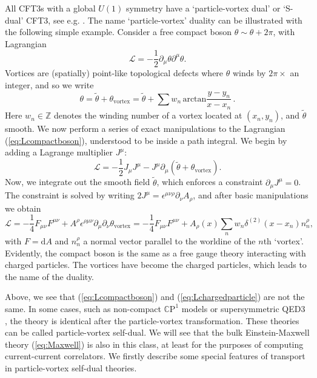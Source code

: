\documentclass[10pt, oneside]{book}
\begin{document}
\begin{doublespace}
All CFT3s with a global $U(1)$ symmetry have a `particle-vortex dual' or `S-dual' CFT3, see e.g. \cite{Witten:2003ya}.
The name `particle-vortex' duality can be illustrated with the following simple example. Consider a free compact boson $\theta \sim \theta + 2\pi$,  with Lagrangian
\begin{equation}
\mathcal{L} = -\frac{1}{2}\partial_\mu \theta \partial^\mu \theta.  \label{eq:Lcompactboson}
\end{equation}
Vortices are (spatially) point-like topological defects where $\theta$ winds by $2\pi\times$ an integer, and so we write \begin{equation}
\theta = \tilde\theta + \theta_{\text{vortex}}  = \tilde\theta + \sum w_n \, \mathrm{arctan} \frac{y-y_n}{x-x_n} \,.
\end{equation}
Here $w_n\in \mathbb{Z}$ denotes the winding number of a vortex located at $(x_n,y_n)$, and $\tilde\theta$ smooth.  We now perform a series of exact manipulations to the Lagrangian (\ref{eq:Lcompactboson}), understood to be inside a path integral.  We begin by adding a Lagrange multiplier $J^\mu$:\begin{equation}
\mathcal{L} =  -\frac{1}{2} J_\mu  J^\mu - J^\mu \partial_\mu (\tilde\theta + \theta_{\text{vortex}}).
\end{equation}
Now, we integrate out the smooth field $\tilde\theta$, which enforces a constraint $\partial_\mu J^\mu=0$.  The constraint is solved by writing $2J^\mu = \epsilon^{\mu\nu\rho}\partial_\nu A_\rho$, and after basic manipulations we obtain \begin{equation}
\mathcal{L} = -\frac{1}{4}F_{\mu\nu} F^{\mu\nu} + A^\rho \epsilon^{\rho\mu\nu}\partial_\mu \partial_\nu \theta_{\text{vortex}} = -\frac{1}{4}F_{\mu\nu} F^{\mu\nu} + A_\rho(x) \sum_n w_n   \delta^{(2)}(x-x_n) n_n^\rho, \label{eq:Lchargedparticle}
\end{equation}
with $F=\mathrm{d}A$ and $n_n^\rho$ a normal vector parallel to the worldine of the $n$th `vortex'.  Evidently, the compact boson is the same as a free gauge theory interacting with charged particles.   The vortices have become the charged particles, which leads to the name of the duality.

Above, we see that (\ref{eq:Lcompactboson}) and (\ref{eq:Lchargedparticle}) are not the same.  In some cases, such as non-compact $\mathbb{C}\mathrm{P}^1$ models \cite{vishwanath2003} or supersymmetric QED3 \cite{Kapustin:1999ha}, the theory is identical after the particle-vortex transformation.  These theories can be called particle-vortex self-dual. We will see that the bulk Einstein-Maxwell theory (\ref{eq:Maxwell}) is also in this class, at least for the purposes of computing current-current correlators. We firstly describe some special features of transport in particle-vortex self-dual theories. 


\end{doublespace}
\end{document}
